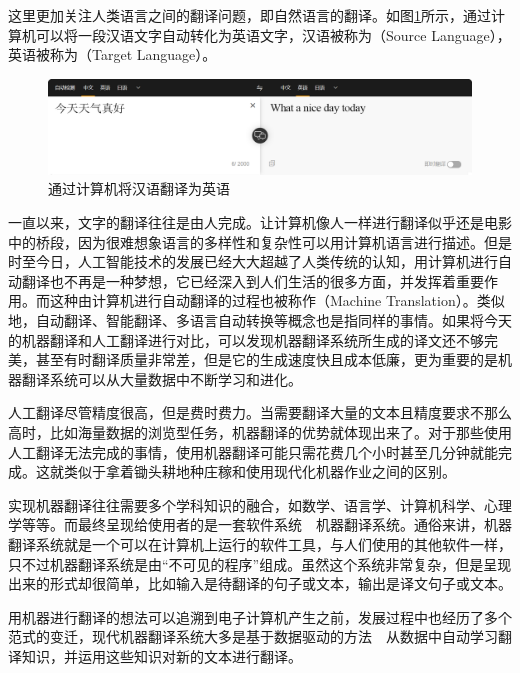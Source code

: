 \parinterval 这里更加关注人类语言之间的翻译问题，即自然语言的翻译。如图\ref{fig:1-1}所示，通过计算机可以将一段汉语文字自动转化为英语文字，汉语被称为{\small{}}（Source Language），英语被称为{\small{}}（Target Language）。

\begin{figure}[htp]
    \centering
\includegraphics[scale=0.25]{./Chapter1/Figures/figure-zh_en-example.png}
    \caption{通过计算机将汉语翻译为英语}
    \label{fig:1-1}
\end{figure}

\parinterval 一直以来，文字的翻译往往是由人完成。让计算机像人一样进行翻译似乎还是电影中的桥段，因为很难想象语言的多样性和复杂性可以用计算机语言进行描述。但是时至今日，人工智能技术的发展已经大大超越了人类传统的认知，用计算机进行自动翻译也不再是一种梦想，它已经深入到人们生活的很多方面，并发挥着重要作用。而这种由计算机进行自动翻译的过程也被称作{\small{}}（Machine Translation）。类似地，自动翻译、智能翻译、多语言自动转换等概念也是指同样的事情。如果将今天的机器翻译和人工翻译进行对比，可以发现机器翻译系统所生成的译文还不够完美，甚至有时翻译质量非常差，但是它的生成速度快且成本低廉，更为重要的是机器翻译系统可以从大量数据中不断学习和进化。

\parinterval 人工翻译尽管精度很高，但是费时费力。当需要翻译大量的文本且精度要求不那么高时，比如海量数据的浏览型任务，机器翻译的优势就体现出来了。对于那些使用人工翻译无法完成的事情，使用机器翻译可能只需花费几个小时甚至几分钟就能完成。这就类似于拿着锄头耕地种庄稼和使用现代化机器作业之间的区别。

\parinterval 实现机器翻译往往需要多个学科知识的融合，如数学、语言学、计算机科学、心理学等等。而最终呈现给使用者的是一套软件系统\ \dash\ 机器翻译系统。通俗来讲，机器翻译系统就是一个可以在计算机上运行的软件工具，与人们使用的其他软件一样，只不过机器翻译系统是由“不可见的程序”组成。虽然这个系统非常复杂，但是呈现出来的形式却很简单，比如输入是待翻译的句子或文本，输出是译文句子或文本。

\parinterval 用机器进行翻译的想法可以追溯到电子计算机产生之前，发展过程中也经历了多个范式的变迁，现代机器翻译系统大多是基于数据驱动的方法\ \dash\ 从数据中自动学习翻译知识，并运用这些知识对新的文本进行翻译。

